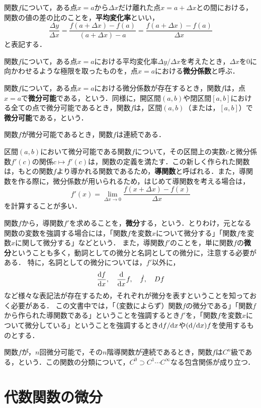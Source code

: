 \begin{definition}[平均変化率]
	関数$f$について，ある点$x = a$から$\Delta x$だけ離れた点$x = a + \Delta x$との間における，関数の値の差の比のことを，\textbf{平均変化率}といい，
	\[
		\frac{\Delta y}{\Delta x} = \frac{f(a+\Delta x) - f(a)}{(a+\Delta x) - a} = \frac{f(a+\Delta x) - f(a)}{\Delta x}
	\]
	と表記する．
\end{definition}
\begin{definition}[微分係数]
	関数$f$について，ある点$x = a$における平均変化率$\Delta y / \Delta x$を考えたとき，$\Delta x$を$0$に向かわせるような極限を取ったものを，点$x = a$における\textbf{微分係数}と呼ぶ．
\end{definition}
\begin{definition}[微分可能]
	関数$f$について，ある点$x = a$における微分係数が存在するとき，関数$f$は，点$x = a$で\textbf{微分可能}である，という．同様に，開区間$(a, b)$や閉区間$[a ,b]$における全ての点で微分可能であるとき，関数$f$は，区間$(a, b)$（または，$[a, b]$）で\textbf{微分可能}である，という．
\end{definition}
\begin{theorem}
	関数$f$が微分可能であるとき，関数$f$は連続である．
\end{theorem}

\begin{definition}[導関数]
	区間$(a,b)$において\footnotemark[1]微分可能である関数$f$について，その区間上の実数$c$と微分係数$f'(c)$の関係$c \mapsto f'(c)$は，関数の定義を満たす．この新しく作られた関数は，もとの関数$f$より導かれる関数であるため，\textbf{導関数}と呼ばれる．また，導関数を作る際に，微分係数が用いられるため，はじめて導関数を考える場合は，
	\[
		f'(x) = \lim\limits_{\Delta x \to 0} \frac{f(x + \Delta x) - f(x)}{\Delta x}
	\]
	を計算することが多い．
\end{definition}
\begin{rem*}
	関数$f$から，導関数$f'$を求めることを，\textbf{微分}する，という．とりわけ，元となる関数の変数を強調する場合には，「関数$f$を変数$x$について微分する」「関数$f$を変数$x$に関して微分する」などという．
	また，導関数$f'$のことを，単に関数$f$の\textbf{微分}ということも多く，動詞としての微分と名詞としての微分に，注意する必要がある．
	特に，名詞としての微分については，$f'$以外に，
	\[
		\frac{\mathrm{d} f}{\mathrm{d} x},\quad \frac{\mathrm{d}}{\mathrm{d} x}f,\quad \dot{f},\quad Df
	\]
	など様々な表記法が存在するため，それぞれが微分を表すということを知っておく必要がある．
	この文書中では，「（変数によらず）関数$f$の微分である」「関数$f$から作られた導関数である」ということを強調するとき$f'$を，「関数$f$を変数$x$について微分している」ということを強調するとき$\mathrm{d} f/\mathrm{d} x$や$(\mathrm{d}/\mathrm{d} x) f$を使用するものとする．
\end{rem*}

\begin{definition}[$C^n$級]
	関数$f$が，$n$回微分可能で，その$n$階導関数が連続であるとき，関数$f$は$C^n$級である，という．この関数の分類について，$C^0 \supset C^1 \cdots C^\infty$なる包含関係が成り立つ．
\end{definition}

\section{代数関数の微分}